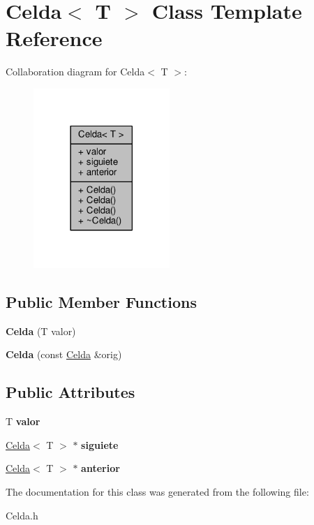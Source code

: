 \hypertarget{class_celda}{\section{Celda$<$ T $>$ Class Template Reference}
\label{class_celda}
}


Collaboration diagram for Celda$<$ T $>$\+:
\nopagebreak
\begin{figure}[H]
\begin{center}
\leavevmode
\includegraphics[width=146pt]{class_celda__coll__graph}
\end{center}
\end{figure}
\subsection*{Public Member Functions}
\begin{DoxyCompactItemize}
\item 
\hypertarget{class_celda_a19d4004458f354c8aef4145e9135b58d}{{\bfseries Celda} (T valor)}\label{class_celda_a19d4004458f354c8aef4145e9135b58d}

\item 
\hypertarget{class_celda_a63648973285cd58a2ea2fb5bf47a0aeb}{{\bfseries Celda} (const \hyperlink{class_celda}{Celda} \&orig)}\label{class_celda_a63648973285cd58a2ea2fb5bf47a0aeb}

\end{DoxyCompactItemize}
\subsection*{Public Attributes}
\begin{DoxyCompactItemize}
\item 
\hypertarget{class_celda_a4165d991b55ff069ebc6019b03c8463d}{T {\bfseries valor}}\label{class_celda_a4165d991b55ff069ebc6019b03c8463d}

\item 
\hypertarget{class_celda_a5ad2ff91a15992430a17af7d6431f3a0}{\hyperlink{class_celda}{Celda}$<$ T $>$ $\ast$ {\bfseries siguiete}}\label{class_celda_a5ad2ff91a15992430a17af7d6431f3a0}

\item 
\hypertarget{class_celda_aacbb2f1f4e4fad69db9ae11c18b02382}{\hyperlink{class_celda}{Celda}$<$ T $>$ $\ast$ {\bfseries anterior}}\label{class_celda_aacbb2f1f4e4fad69db9ae11c18b02382}

\end{DoxyCompactItemize}


The documentation for this class was generated from the following file\+:\begin{DoxyCompactItemize}
\item 
Celda.\+h\end{DoxyCompactItemize}
